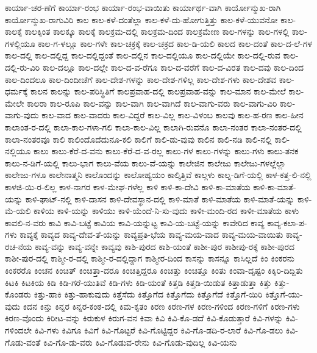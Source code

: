 {ಕಾರ್ಯಾ-ಚರ-ಣೆಗೆ
ಕಾರ್ಯಾ-ರಂಭ
ಕಾರ್ಯಾ-ರಂಭ-ವಾಯಿತು
ಕಾರ್ಯಾರ್ಥ-ವಾಗಿ
ಕಾರ್ಯೋನ್ಮುಖ-ರಾಗಿ
ಕಾರ್ಯೋನ್ಮುಖ-ರಾಗುವಿರಿ
ಕಾಲ
ಕಾಲ-ಕಳೆ-ದಂತೆಲ್ಲಾ
ಕಾಲ-ಕಳೆ-ದು-ಹೋಗುತ್ತಿತ್ತು
ಕಾಲ-ಕಳೆ-ಯುವನೋ
ಕಾಲ-ಕಾಲಕ್ಕೆ
ಕಾಲಕ್ಕಿಂತ
ಕಾಲಕ್ಕೂ
ಕಾಲಕ್ಕೆ
ಕಾಲಕ್ರಮ-ದಲ್ಲಿ
ಕಾಲಕ್ರಮ-ದಿಂದ
ಕಾಲಕ್ರಮೇಣ
ಕಾಲ-ಗಳನ್ನು
ಕಾಲ-ಗಳಲ್ಲಿ
ಕಾಲ-ಗಳಲ್ಲಿಯೂ
ಕಾಲ-ಗ-ಳಲ್ಲೂ
ಕಾಲ-ಗಳೇ
ಕಾಲ-ಚಕ್ರಕ್ಕೆ
ಕಾಲ-ಚಕ್ರದ
ಕಾಲ-ಡಿ-ಯಲಿ
ಕಾಲದ
ಕಾಲ-ದಂತೆ
ಕಾಲ-ದ-ಲೆ-ಗಳ
ಕಾಲ-ದಲ್ಲಿ
ಕಾಲ-ದಲ್ಲಿದ್ದ
ಕಾಲ-ದಲ್ಲಿದ್ದಂತೆ
ಕಾಲ-ದಲ್ಲಿನ
ಕಾಲ-ದಲ್ಲಿಯೂ
ಕಾಲ-ದಲ್ಲಿಯೇ
ಕಾಲ-ದಲ್ಲಿ-ರುವ
ಕಾಲ-ದಲ್ಲಿ-ರು-ವಿರಿ
ಕಾಲ-ದಲ್ಲೂ
ಕಾಲ-ದಲ್ಲೇ
ಕಾಲ-ದ-ವ-ರೆಗೂ
ಕಾಲ-ದ-ವರೆಗೆ
ಕಾಲ-ದ-ವಿರತ
ಕಾಲ-ದವು
ಕಾಲ-ದಿಂದ
ಕಾಲ-ದಿಂದಲೂ
ಕಾಲ-ದಿಂದೀಚೆಗೆ
ಕಾಲ-ದೇಶ-ಗಳನ್ನು
ಕಾಲ-ದೇಶ-ಗಳಿಲ್ಲ
ಕಾಲ-ದೇಶ-ಗಳು
ಕಾಲ-ದೇಶವ
ಕಾಲ-ಧರ್ಮಕ್ಕೆ
ಕಾಲನ
ಕಾಲನ್ನು
ಕಾಲ-ಪರಿಸ್ಥಿತಿಗೆ
ಕಾಲಪ್ರವಾಹ-ದಲ್ಲಿ
ಕಾಲಪ್ರವಾಹ-ವನ್ನು
ಕಾಲ-ಮಾನ
ಕಾಲ-ಮೇಲೆ
ಕಾಲ-ಮೇಲೇ
ಕಾಲರಾ
ಕಾಲ-ರೂಪಿ
ಕಾಲ-ವನ್ನು
ಕಾಲ-ವಾಗಿ
ಕಾಲ-ವಾಗಿದೆ
ಕಾಲ-ವಾಗು-ವರು
ಕಾಲ-ವಾಗು-ವಿರಿ
ಕಾಲ-ವಾಗು-ವುದು
ಕಾಲ-ವಾದ
ಕಾಲ-ವಾದರು
ಕಾಲ-ವಿದ್ದರೆ
ಕಾಲ-ವಿಲ್ಲ
ಕಾಲ-ವಿಳಂಬ
ಕಾಲವು
ಕಾಲ-ಹ-ರಣ
ಕಾಲ-ಹೀನ
ಕಾಲಾಂತ-ರ-ದಲ್ಲಿ
ಕಾಲಾ-ಕಾಲ-ಗಳಾ-ಗಲಿ
ಕಾಲಾ-ಕಾಲ-ವಿಲ್ಲ
ಕಾಲಾಗಿ-ರುವನೊ
ಕಾಲಾ-ನಂತರ
ಕಾಲಾ-ನಂತರ-ದಲ್ಲಿ
ಕಾಲಾ-ನಂತರವೂ
ಕಾಲಿ
ಕಾಲಿಂದೊದೆದುನೂ-ಕಲಿ
ಕಾಲಿಗೆ
ಕಾಲಿ-ಡು-ವುವು
ಕಾಲಿನ
ಕಾಲಿ-ನಡಿ
ಕಾಲಿ-ನಲ್ಲಿ
ಕಾಲಿ-ನಲ್ಲಿಯೂ
ಕಾಲು
ಕಾಲು-ಕೆರೆ-ದ-ವನು
ಕಾಲು-ಕೆರೆ-ದ-ವ-ರಲ್ಲ
ಕಾಲು-ಗಳ
ಕಾಲು-ಗಳನ್ನು
ಕಾಲು-ಗಳು
ಕಾಲು-ತನಕ
ಕಾಲು-ನ-ಡಿಗೆ-ಯಲ್ಲಿ
ಕಾಲು-ಭಾಗ
ಕಾಲು-ವೆಯ
ಕಾಲು-ವೆ-ಯನ್ನು
ಕಾಲೇಜಿನ
ಕಾಲೇಜು
ಕಾಲೇಜು-ಗಳಲ್ಲೆಲ್ಲಾ
ಕಾಲೇಜು-ಗಳೂ
ಕಾಲೇನಾತ್ಮನಿ
ಕಾಲೊಂದನ್ನು
ಕಾಲೋಹ್ಯಯಂ
ಕಾಲ್ಕಿತ್ತಿವೆ
ಕಾಲ್ಗಳು
ಕಾಲ್ನ-ಡಿಗೆ-ಯಲ್ಲಿ
ಕಾಳ-ಕತ್ತ-ಲಿ-ನಲ್ಲಿ
ಕಾಳಜಿ-ಯಿ-ರ-ಲಿಲ್ಲ
ಕಾಳ-ನಾಗರ
ಕಾಳ-ಮೇಘ-ಗಳೆಲ್ಲ
ಕಾಳಿ
ಕಾಳಿ-ಕಾ-ದೇವಿ
ಕಾಳಿ-ಕಾ-ಮಾತೆಯ
ಕಾಳಿ-ಕಾ-ಮಾತೆ-ಯನ್ನು
ಕಾಳಿ-ಘಾಟ್-ನಲ್ಲಿ
ಕಾಳಿ-ದಾಸನ
ಕಾಳಿ-ದೇವಸ್ಥಾನ-ದಲ್ಲಿ
ಕಾಳಿ-ಮಾತೆ
ಕಾಳಿ-ಮಾತೆಯ
ಕಾಳಿ-ಮಾತೆ-ಯನ್ನು
ಕಾಳಿ-ಮೆ-ಯಲಿ
ಕಾಳಿಯ
ಕಾಳಿ-ಯನ್ನು
ಕಾಳಿಯು
ಕಾಳಿ-ಯೆಂದೆ-ನಿ-ಸು-ವುದು
ಕಾಳೀ-ಮಂದಿ-ರದ
ಕಾಳೀ-ಮಾತೆಯ
ಕಾಳು
ಕಾವಲಿ-ನ-ವರು
ಕಾವಿ
ಕಾವಿ-ಬಟ್ಟೆ
ಕಾವಿಯ
ಕಾವಿ-ಯನ್ನುಟ್ಟ
ಕಾವಿ-ಯ-ಬಟ್ಟೆ-ಯನ್ನು
ಕಾವೇರಿದ
ಕಾವ್ಯ
ಕಾವ್ಯ-ಕಲಾ-ಪ-ಗಳು
ಕಾವ್ಯಕ್ಕೆ
ಕಾವ್ಯದ
ಕಾವ್ಯ-ದೇವ-ತೆ-ಯನ್ನು
ಕಾವ್ಯಪ್ರತಿ-ಭೆಯ
ಕಾವ್ಯ-ಮಯ-ವಾದ
ಕಾವ್ಯ-ಮಯ-ವಾಯಿತು
ಕಾವ್ಯ-ರಚ-ನೆಯ
ಕಾವ್ಯ-ವನ್ನು
ಕಾವ್ಯ-ವನ್ನೇ
ಕಾವ್ಯವು
ಕಾಶಿ-ಪುರದ
ಕಾಶಿ-ಯಂತೆ
ಕಾಶೀ-ಪುರ
ಕಾಶೀಪು-ರಕ್ಕೆ
ಕಾಶೀ-ಪುರದ
ಕಾಶೀ-ಪುರ-ದಲ್ಲಿ
ಕಾಶ್ಮೀ-ರ-ದಲ್ಲಿ
ಕಾಶ್ಮೀ-ರ-ದಲ್ಲಿದ್ದಾಗ
ಕಾಶ್ಮೀರ-ದಿಂದ
ಕಾಸನ್ನು
ಕಾಸನ್ನೂ
ಕಾಸಿಲ್ಲದೆ
ಕಿಂ
ಕಿಂಕರನು
ಕಿಂಕರರೊ
ಕಿಂಚನ
ಕಿಂಚಿತ್
ಕಿಂಚಿತ್ತಾ-ದರೂ
ಕಿಂಚಿತ್ತಿದ್ದರೂ
ಕಿಂಚಿತ್ತು
ಕಿಂಚಿತ್ತೂ
ಕಿಂತು
ಕಿಂವಾ-ದೃಷ್ಟಂ
ಕಿಕ್ಕಿರಿ-ದಿದ್ದಿತು
ಕಿಟಕಿ
ಕಿಟಕಿಯ
ಕಿಡಿ
ಕಿಡಿ-ಗರೆ-ಯುತಿವೆ
ಕಿಡಿ-ಗಳು
ಕಿಡಿ-ಯಂತೆ
ಕಿತ್ತಡಿ
ಕಿತ್ತಡಿ-ಯಿಡುತ
ಕಿತ್ತಾಡುತ್ತಾ
ಕಿತ್ತು
ಕಿತ್ತು-ಕೊಂಡರು
ಕಿತ್ತು-ಹಾಕಿ
ಕಿತ್ತು-ಹಾಕುವುದು
ಕಿತ್ತೆಸೆದು
ಕಿತ್ತೊಗೆದ
ಕಿತ್ತೊಗೆದು
ಕಿತ್ತೊಗೆದೆ
ಕಿತ್ತೊಗೆ-ಯಿರಿ
ಕಿತ್ತೊಗೆ-ಯು-ವುದು
ಕಿದನ
ಕಿನ್ತು
ಕಿನ್ನರ
ಕಿನ್ನರ-ಕಂಠ-ದಲ್ಲಿ
ಕಿಮ-ಕೃತಂ
ಕಿರಣ
ಕಿರಣ-ಗಳ
ಕಿರಣ-ಗಳಿಂದ
ಕಿರಣ-ಗಳಿಗೆ
ಕಿರಣ-ಗಳು
ಕಿರಣ-ವೊಂದು
ಕಿರೀಟ-ವನ್ನು
ಕಿರುಕುಳ
ಕಿರುಗ-ವನ
ಕಿವಾ
ಕಿವಿ
ಕಿವಿ-ಕೊ-ಡದೆ
ಕಿವಿ-ಕೊಡುತ್ತಾರೆ
ಕಿವಿ-ಗಳನ್ನು
ಕಿವಿ-ಗಳಿಂದಲೇ
ಕಿವಿ-ಗಳು
ಕಿವಿಗೂ
ಕಿವಿಗೆ
ಕಿವಿ-ಗೊಟ್ಟರೆ
ಕಿವಿ-ಗೊಟ್ಟಿದ್ದರ
ಕಿವಿ-ಗೊ-ಡದಿ-ರ-ಲಾರೆ
ಕಿವಿ-ಗೊ-ಡಲು
ಕಿವಿ-ಗೊಡು-ವಂತೆ
ಕಿವಿ-ಗೊ-ಡು-ವರು
ಕಿವಿ-ಗೊಡುವ-ರೇನು
ಕಿವಿ-ಗೊಡು-ವುದಿಲ್ಲ
ಕಿವಿ-ಯನು
}
